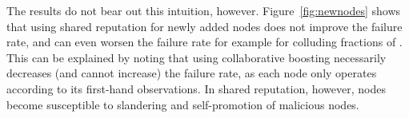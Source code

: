 The results do not bear out this intuition,
however. Figure~\ref{fig:newnodes} shows that using shared reputation
for newly added nodes does not improve the failure rate, and can even
worsen the failure rate for example for colluding fractions of
. This can be explained by noting that using collaborative
boosting necessarily decreases (and cannot increase) the failure rate,
as each node only operates according to its first-hand observations. In
shared reputation, however, nodes become susceptible to slandering and
self-promotion of malicious nodes.























